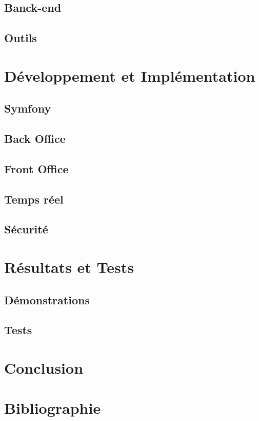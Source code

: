 \documentclass[12pt]{article}
\begin{document}
\subsection{Banck-end}

\subsection{Outils}

\newpage

\section{Développement et Implémentation}

\subsection{Symfony}

\subsection{Back Office}

\subsection{Front Office}

\subsection{Temps réel}

\subsection{Sécurité}

\newpage

\section{Résultats et Tests}

\subsection{Démonstrations}

\subsection{Tests}



\newpage
\section{Conclusion}


\newpage
\section{Bibliographie}


		
\end{document}
